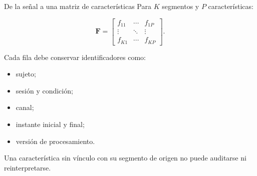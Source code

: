 \documentclass[
  ignorenonframetext,
  aspectratio=169,
  spanish,
  professionalfonts]{beamer}
\providecommand{\tightlist}{%
  \setlength{\itemsep}{0pt}\setlength{\parskip}{0pt}}
\begin{document}
\begin{frame}[shrink]{De la señal a una matriz de características}
\protect{}\label{de-la-seuxf1al-a-una-matriz-de-caracteruxedsticas}
Para \(K\) segmentos y \(P\) características:

\[
\mathbf{F}=
\begin{bmatrix}
f_{11}&\cdots&f_{1P}\\
\vdots&\ddots&\vdots\\
f_{K1}&\cdots&f_{KP}
\end{bmatrix}.
\]

Cada fila debe conservar identificadores como:

\begin{itemize}
\tightlist
\item
  sujeto;
\item
  sesión y condición;
\item
  canal;
\item
  instante inicial y final;
\item
  versión de procesamiento.
\end{itemize}

\begin{tcolorbox}[enhanced jigsaw, arc=.35mm, bottomrule=.15mm, bottomtitle=1mm, breakable, colback=white, colbacktitle=quarto-callout-important-color!10!white, colframe=quarto-callout-important-color-frame, coltitle=black, left=2mm, leftrule=.75mm, opacityback=0, opacitybacktitle=0.6, rightrule=.15mm, title={Trazabilidad}, titlerule=0mm, toprule=.15mm, toptitle=1mm]

Una característica sin vínculo con su segmento de origen no puede
auditarse ni reinterpretarse.

\end{tcolorbox}
\end{frame}
\end{document}
